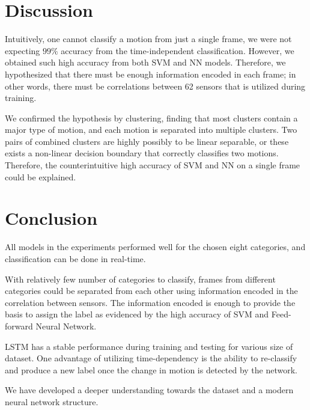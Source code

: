 \documentclass[letterpaper, 10pt, conference]{ieeeconf}
\begin{document}
\section{Discussion}

Intuitively, one cannot classify a motion from just a single frame, we were not expecting $99\%$ accuracy from the time-independent classification. However, we obtained such high accuracy from both SVM and NN models. Therefore, we hypothesized that there must be enough information encoded in each frame; in other words, there must be correlations between 62 sensors that is utilized during training. 

We confirmed the hypothesis by clustering, finding that most clusters contain a major type of motion, and each motion is separated into multiple clusters. Two pairs of combined clusters are highly possibly to be linear separable, or these exists a non-linear decision boundary that correctly classifies two motions. Therefore, the counterintuitive high accuracy of SVM and NN on a single frame could be explained. 

\section{Conclusion}

All models in the experiments performed well for the chosen eight categories, and classification can be done in real-time.

With relatively few number of categories to classify, frames from different categories could be separated from each other using information encoded in the correlation between sensors. The information encoded is enough to provide the basis to assign the label as evidenced by the high accuracy of SVM and Feed-forward Neural Network.

LSTM has a stable performance during training and testing for various size of dataset. One advantage of utilizing time-dependency is the ability to re-classify and produce a new label once the change in motion is detected by the network.

We have developed a deeper understanding towards the dataset and a modern neural network structure.
\end{document}
